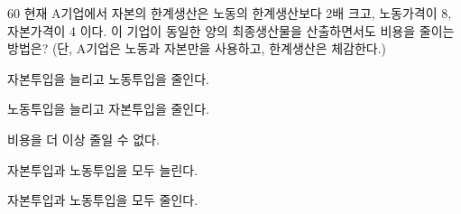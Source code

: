 \begin{question}{60}
현재 A기업에서 자본의 한계생산은 노동의 한계생산보다 2배 크고, 노동가격이 8, 자본가격이 4 이다. 이 기업이 동일한 양의 최종생산물을 산출하면서도 비용을 줄이는 방법은? (단, A기업은 노동과 자본만을 사용하고, 한계생산은 체감한다.)
\begin{choices}
  \item 자본투입을 늘리고 노동투입을 줄인다.
  \item 노동투입을 늘리고 자본투입을 줄인다.
  \item 비용을 더 이상 줄일 수 없다.
  \item 자본투입과 노동투입을 모두 늘린다.
  \item 자본투입과 노동투입을 모두 줄인다.
\end{choices}
\end{question}
